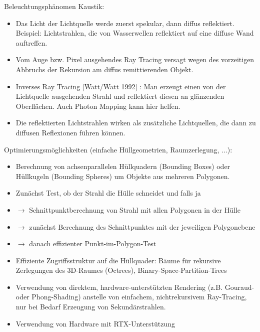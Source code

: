 \documentclass[10pt,landscape]{article}
\begin{document}
\begin{multicols}{3}
Beleuchtungsphänomen Kaustik:
\begin{itemize}
  \item Das Licht der Lichtquelle werde zuerst spekular, dann diffus reflektiert. Beispiel: Lichtstrahlen, die von Wasserwellen reflektiert auf eine diffuse Wand auftreffen.
  \item Vom Auge bzw. Pixel ausgehendes Ray Tracing versagt wegen des vorzeitigen Abbruchs der Rekursion am diffus remittierenden Objekt.
  \item Inverses Ray Tracing [Watt/Watt 1992] : Man erzeugt einen von der Lichtquelle ausgehenden Strahl und reflektiert diesen an glänzenden Oberflächen. Auch Photon Mapping kann hier helfen.
  \item Die reflektierten Lichtstrahlen wirken als zusätzliche Lichtquellen, die dann zu diffusen Reflexionen führen können.
\end{itemize}

Optimierungsmöglichkeiten (einfache Hüllgeometrien, Raumzerlegung, ...):
\begin{itemize}
  \item Berechnung von achsenparallelen Hüllquadern (Bounding Boxes) oder Hüllkugeln (Bounding Spheres) um Objekte aus mehreren Polygonen.
  \item Zunächst Test, ob der Strahl die Hülle schneidet und falls ja
  \item $\rightarrow$ Schnittpunktberechnung von Strahl mit allen Polygonen in der Hülle
  \item $\rightarrow$ zunächst Berechnung des Schnittpunktes mit der jeweiligen Polygonebene
  \item $\rightarrow$ danach effizienter Punkt-im-Polygon-Test
  \item Effiziente Zugriffsstruktur auf die Hüllquader: Bäume für rekursive Zerlegungen des 3D-Raumes (Octrees), Binary-Space-Partition-Trees
  \item Verwendung von direktem, hardware-unterstützten Rendering (z.B. Gouraud- oder Phong-Shading) anstelle von einfachem, nichtrekursivem Ray-Tracing, nur bei Bedarf Erzeugung von Sekundärstrahlen.
  \item Verwendung von Hardware mit RTX-Unterstützung
\end{itemize}


\end{multicols}
\end{document}
